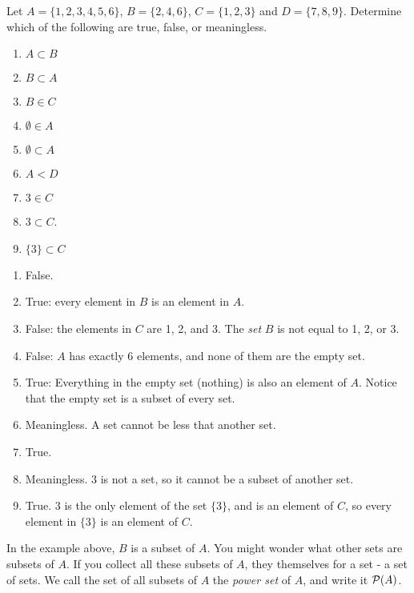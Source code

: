 \documentclass[12pt]{article}
\begin{document}
\begin{example}
 Let $A = \{1, 2, 3, 4, 5, 6\}$, $B = \{2, 4, 6\}$, $C = \{1, 2, 3\}$ and $D = \{7, 8, 9\}$.  Determine which of the following are true, false, or meaningless.
\begin{multicols}{3}
\begin{enumerate}
\item $A \subset B$
\item $B \subset A$
\item $B \in C$
\item $\emptyset \in A$
\item $\emptyset \subset A$
\item $A < D$
\item $3 \in C$
\item $3 \subset C$.
\item $\{3\} \subset C$
\end{enumerate}
\end{multicols}
\begin{solution}
 \begin{enumerate}
  \item False.
\item True: every element in $B$ is an element in $A$.
\item False: the elements in $C$ are 1, 2, and 3.  The \emph{set} $B$ is not equal to 1, 2, or 3.
\item False: $A$ has exactly 6 elements, and none of them are the empty set.
\item True: Everything in the empty set (nothing) is also an element of $A$.  Notice that the empty set is a subset of every set.
\item Meaningless.  A set cannot be less that another set.
\item True.
\item Meaningless.  $3$ is not a set, so it cannot be a subset of another set.
\item True.  $3$ is the only element of the set $\{3\}$, and is an element of $C$, so every element in $\{3\}$ is an element of $C$.
 \end{enumerate}
\end{solution}
\end{example}

In the example above, $B$ is a subset of $A$.  You might wonder what other sets are subsets of $A$.  If you collect all these subsets of $A$, they themselves for a set - a set of sets.  We call the set of all subsets of $A$ the \emph{power set} of $A$, and write it $\mathcal P(A)$.  
\end{document}
